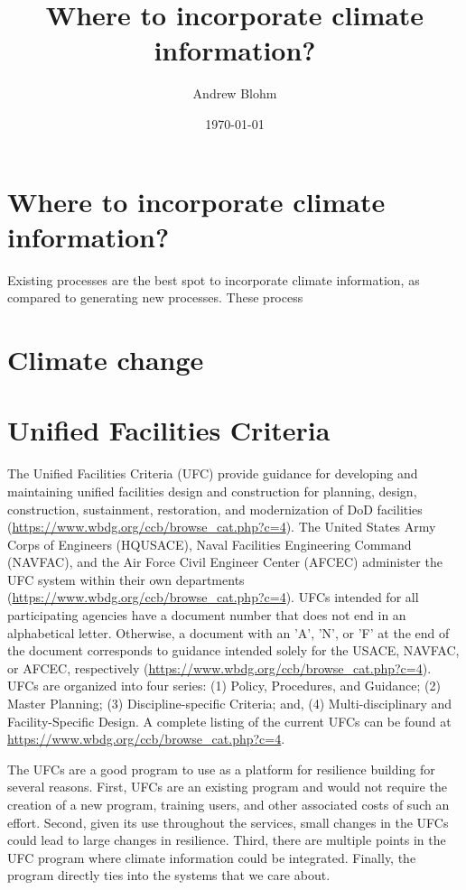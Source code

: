\documentclass[10pt]{amsart}
\title{Where to incorporate climate information?}
\author{Andrew Blohm}
\date{\today}
\begin{document}
\maketitle
\section{Where to incorporate climate information?}
Existing processes are the best spot to incorporate climate information, as compared to generating new processes. 
These process

\section{Climate change}

\section{Unified Facilities Criteria}
The Unified Facilities Criteria (UFC) provide guidance for developing and maintaining unified facilities design and construction for planning, design, construction, sustainment, restoration, and modernization of DoD facilities \parencite{}(\url{https://www.wbdg.org/ccb/browse_cat.php?c=4}).
The United States Army Corps of Engineers (HQUSACE), Naval Facilities Engineering Command (NAVFAC), and the Air Force Civil Engineer Center (AFCEC) administer the UFC system within their own departments \parencite{} (\url{https://www.wbdg.org/ccb/browse_cat.php?c=4}).
UFCs intended for all participating agencies have a document number that does not end in an alphabetical letter. 
Otherwise, a document with an 'A', 'N', or 'F' at the end of the document corresponds to guidance intended solely for the USACE, NAVFAC, or AFCEC, respectively \parencite{}(\url{https://www.wbdg.org/ccb/browse_cat.php?c=4}).
UFCs are organized into four series: (1) Policy, Procedures, and Guidance; (2) Master Planning; (3) Discipline-specific Criteria; and, (4) Multi-disciplinary and Facility-Specific Design. 
A complete listing of the current UFCs can be found at \url{https://www.wbdg.org/ccb/browse_cat.php?c=4}.

The UFCs are a good program to use as a platform for resilience building for several reasons.
First, UFCs are an existing program and would not require the creation of a new program, training users, and other associated costs of such an effort.
Second, given its use throughout the services, small changes in the UFCs could lead to large changes in resilience.
Third, there are multiple points in the UFC program where climate information could be integrated.
Finally, the program directly ties into the systems that we care about. 
\end{document}
